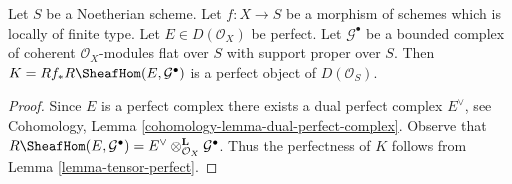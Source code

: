 \begin{lemma}
\label{lemma-ext-perfect}
Let $S$ be a Noetherian scheme. Let $f : X \to S$ be a morphism of schemes
which is locally of finite type. Let $E \in D(\mathcal{O}_X)$ be perfect.
Let $\mathcal{G}^\bullet$ be a bounded complex of coherent
$\mathcal{O}_X$-modules flat over $S$ with support proper over $S$.
Then $K = Rf_*R\SheafHom(E, \mathcal{G}^\bullet)$ is a perfect object of
$D(\mathcal{O}_S)$.
\end{lemma}

\begin{proof}
Since $E$ is a perfect complex there exists a dual perfect complex
$E^\vee$, see Cohomology, Lemma \ref{cohomology-lemma-dual-perfect-complex}.
Observe that $R\SheafHom(E, \mathcal{G}^\bullet) =
E^\vee \otimes^\mathbf{L}_{\mathcal{O}_X} \mathcal{G}^\bullet$.
Thus the perfectness of $K$ follows from Lemma \ref{lemma-tensor-perfect}.
\end{proof}
